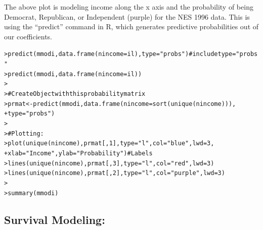\documentclass[12pt]{article}\usepackage[]{graphicx}\usepackage[]{color}
\makeatletter
\newcommand{\hlnum}[1]{\textcolor[rgb]{0.82,0.78,0.62}{#1}}%
\newcommand{\hlstr}[1]{\textcolor[rgb]{0.82,0.78,0.62}{#1}}%
\newcommand{\hlcom}[1]{\textcolor[rgb]{0.404,0.408,0.42}{#1}}%
\newcommand{\hlstd}[1]{\textcolor[rgb]{0.882,0.878,0.898}{#1}}%
\newcommand{\hlkwb}[1]{\textcolor[rgb]{0.902,0.675,0.196}{#1}}%
\newcommand{\hlkwc}[1]{\textcolor[rgb]{0.812,0.522,0.388}{#1}}%
\newcommand{\hlkwd}[1]{\textcolor[rgb]{0.733,0.388,0.812}{#1}}%
\newenvironment{kframe}{%
 \def\at@end@of@kframe{}%
 \ifinner\ifhmode%
  \def\at@end@of@kframe{\end{minipage}}%
  \begin{minipage}{\columnwidth}%
 \fi\fi%
 \def\FrameCommand##1{\hskip\@totalleftmargin \hskip-\fboxsep
 \colorbox{shadecolor}{##1}\hskip-\fboxsep
     \hskip-\linewidth \hskip-\@totalleftmargin \hskip\columnwidth}%
 \MakeFramed {\advance\hsize-\width
   \@totalleftmargin\z@ \linewidth\hsize
   \@setminipage}}%
 {\par\unskip\endMakeFramed%
 \at@end@of@kframe}
\newenvironment{knitrout}{}{} %
\makeatother
\begin{document}
\begin{flushleft}
The above plot is modeling income along the x axis and the probability of being Democrat, Republican, or Independent (purple) for the NES 1996 data. This is using the ``predict'' command in R, which generates predictive probabilities out of our coefficients.

\begin{knitrout}
\color{fgcolor}\begin{kframe}
\begin{alltt}
\hlstd{> }\hlkwd{predict}\hlstd{(mmodi,}\hlkwd{data.frame}\hlstd{(}\hlkwc{nincome}\hlstd{=il),}\hlkwc{type}\hlstd{=}\hlstr{"probs"}\hlstd{)} \hlcom{# include type="probs"}
\hlstd{> }\hlkwd{predict}\hlstd{(mmodi,}\hlkwd{data.frame}\hlstd{(}\hlkwc{nincome}\hlstd{=il))}
\hlstd{> }
\hlstd{> }\hlcom{# Create Object with this probability matrix}
\hlstd{> }\hlstd{prmat} \hlkwb{<-} \hlkwd{predict}\hlstd{(mmodi,}\hlkwd{data.frame}\hlstd{(}\hlkwc{nincome}\hlstd{=}\hlkwd{sort}\hlstd{(}\hlkwd{unique}\hlstd{(nincome))),}
\hlstd{+ }         \hlkwc{type}\hlstd{=}\hlstr{"probs"}\hlstd{)}
\hlstd{> }
\hlstd{> }\hlcom{# Plotting:}
\hlstd{> }\hlkwd{plot}\hlstd{(}\hlkwd{unique}\hlstd{(nincome), prmat[,}\hlnum{1}\hlstd{],} \hlkwc{type}\hlstd{=}\hlstr{"l"}\hlstd{,} \hlkwc{col}\hlstd{=}\hlstr{"blue"}\hlstd{,} \hlkwc{lwd}\hlstd{=}\hlnum{3}\hlstd{,}
\hlstd{+ }       \hlkwc{xlab}\hlstd{=}\hlstr{"Income"}\hlstd{,} \hlkwc{ylab}\hlstd{=}\hlstr{"Probability"}\hlstd{)} \hlcom{# Labels}
\hlstd{> }\hlkwd{lines}\hlstd{(}\hlkwd{unique}\hlstd{(nincome), prmat[,}\hlnum{3}\hlstd{],} \hlkwc{type}\hlstd{=}\hlstr{"l"}\hlstd{,} \hlkwc{col}\hlstd{=}\hlstr{"red"}\hlstd{,} \hlkwc{lwd}\hlstd{=}\hlnum{3}\hlstd{)}
\hlstd{> }\hlkwd{lines}\hlstd{(}\hlkwd{unique}\hlstd{(nincome), prmat[,}\hlnum{2}\hlstd{],} \hlkwc{type}\hlstd{=}\hlstr{"l"}\hlstd{,} \hlkwc{col}\hlstd{=}\hlstr{"purple"}\hlstd{,} \hlkwc{lwd}\hlstd{=}\hlnum{3}\hlstd{)}
\hlstd{> }
\hlstd{> }\hlkwd{summary}\hlstd{(mmodi)}
\end{alltt}
\end{kframe}
\end{knitrout}















\clearpage
\subsection{Survival Modeling:}


\end{flushleft}
\end{document}
